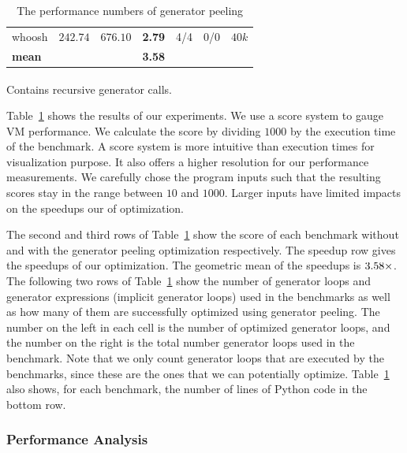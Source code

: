 \begin{table}
\begin{center}
\begin{tabular}{ l r r r r r r }
      \textsf{whoosh}       &  $242.74$   & $676.10$    & \textbf{2.79}  & 4/4 & 0/0 & $40k$ \\
      \textbf{mean}         &             &             & \textbf{3.58}  &     &     & \\
      \bottomrule
	\end{tabular}
    \begin{tablenotes}
    \item \textsuperscript{\textdagger} Contains recursive generator calls.
    \end{tablenotes}
    \caption{The performance numbers of generator peeling}
    \label{tab:ch6-peeling-benchmark-scores}
  \end{center}
\end{table}

Table~\ref{tab:ch6-peeling-benchmark-scores} shows the results of our experiments.
We use a score system to gauge VM performance.
We calculate the score by dividing $1000$ by the execution time of the benchmark.
A score system is more intuitive than execution times for visualization purpose.
It also offers a higher resolution for our performance measurements.
We carefully chose the program inputs such that the resulting scores stay in the range between $10$ and $1000$.
Larger inputs have limited impacts on the speedups our of optimization.

The second and third rows of Table~\ref{tab:ch6-peeling-benchmark-scores} show the score of each benchmark without and with the generator peeling optimization respectively.
The speedup row gives the speedups of our optimization.
The geometric mean of the speedups is $3.58{}\times$.
The following two rows of Table~\ref{tab:ch6-peeling-benchmark-scores} show the number of generator loops and generator expressions (implicit generator loops) used in the benchmarks as well as how many of them are successfully optimized using generator peeling.
The number on the left in each cell is the number of optimized generator loops, and the number on the right is the total number generator loops used in the benchmark.
Note that we only count generator loops that are executed by the benchmarks, since these are the ones that we can potentially optimize.
Table~\ref{tab:ch6-peeling-benchmark-scores} also shows, for each benchmark, the number of lines of Python code in the bottom row.

\subsubsection*{Performance Analysis}

